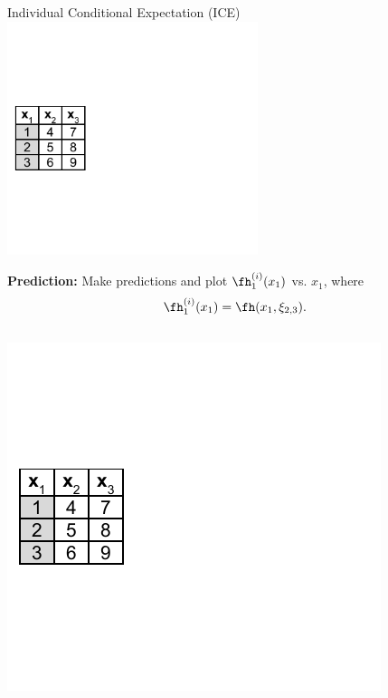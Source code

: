 \documentclass[11pt,compress,t,notes=noshow, xcolor=table]{beamer}
\begin{document}
\begin{vbframe}{Individual Conditional Expectation (ICE)}
\includegraphics[page=3, width=0.55\textwidth]{figure_man/ice_pd_plot_demo}

\textbf{Prediction:} Make predictions and plot $\fh_{1}^{(i)}(x_1)$ vs. $x_1$, where $$\fh_{1}^{(i)}(x_1) = \fh(x_1, \xi_{2, 3}).$$

\framebreak

\begin{columns}[T]
\begin{column}{0.55\textwidth}
\vspace*{-\topsep}
\vspace*{0.5\lineskip}
\includegraphics[page=5, trim=-3.69cm 0cm 3.69cm 0cm, width=\textwidth]{figure_man/ice_pd_plot_demo}
\end{column}
\begin{column}{0.45\textwidth}


\end{column}
\end{columns}
\end{vbframe}
\end{document}
